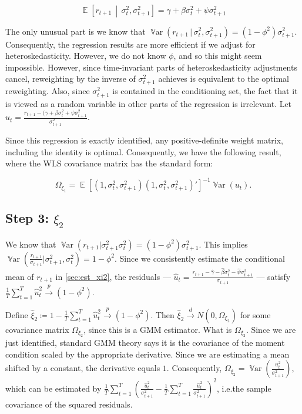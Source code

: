 \documentclass[11pt, letterpaper, twoside, final]{article}
\newcommand*{\dto}{\overset{d}{\longrightarrow}}
\newcommand*{\pto}{\overset{p}{\longrightarrow}}
\newcommand*{\mvert}{\,\middle\vert\,}
\newcommand*{\ivert}{\,\vert\,}
\DeclareMathOperator*{\Var}{\mathbb{V}ar}
\DeclareMathOperator*{\E}{\mathbb{E}}
\begin{document}
\begin{equation}
    \E\left[r_{t+1} \mvert \sigma^2_t, \sigma^2_{t+1}\right]  = \gamma + \beta \sigma^2_t + \psi \sigma^2_{t+1}
\end{equation}

The only unusual part is we know that $\Var(r_{t+1} \ivert \sigma^2_t, \sigma^2_{t+1}) = (1-\phi^2)
\sigma^2_{t+1}$.
Consequently, the regression results  are more efficient if we adjust for heteroskedasticity.
However, we do not know $\phi$, and so this might seem impossible.
However, since time-invariant parts of heteroskedasticity adjustments cancel, reweighting by the inverse of
$\sigma^2_{t+1}$ achieves is equivalent to the optimal reweighting. 
Also, since $\sigma^2_{t+1}$ is contained in the conditioning set, the fact that it is viewed as a random variable
in other parts  of the regression is irrelevant.
Let $u_t = \frac{r_{t+1} - (\gamma + \beta \sigma^2_{t} + \psi \sigma^2_{t+1}}{\sigma^2_{t+1}}$.

Since this regression is exactly identified, any positive-definite weight matrix, including the identity is
optimal.
Consequently, we have the following result, where the WLS covariance matrix has the standard form:

\begin{equation}
    \Omega_{\xi_1} = \E\left[\left(1, \sigma^2_{t}, \sigma^2_{t+1}\right) \left(1, \sigma^2_{t},
    \sigma^2_{t+1}\right)'\right]^{-1} \Var\left(u_t\right).
\end{equation}


\subsection{Step 3: $\xi_2$}

We know that $\Var(r_{t+1} \vert \sigma^2_{t+1} \sigma^2_t) = (1-\phi^2) \sigma^2_{t+1}$.
This implies $\Var(\frac{r_{t+1}}{\sigma_{t+1}} \vert \sigma^2_{t+1}, \sigma^2_t) = 1 - \phi^2$.
Since we consistently estimate the conditional mean of $r_{t+1}$ in \cref{sec:est_xi2}, the residuals ---
$\widehat{u}_t = \frac{r_{t+1} - \widehat{\gamma} - \widehat{\beta}\sigma^2_t - \widehat{\psi}
\sigma^2_{t+1}}{\sigma_{t+1}}$ --- satisfy $\frac{1}{T} \sum_{t=1}^T \hat{u}_t^2 \pto (1 - \phi^2)$.

Define $\widehat{\xi}_2 \coloneqq 1 - \frac{1}{T} \sum_{t=1}^T \hat{u}_t^2 \pto (1 - \phi^2)$.
Then $\widehat{\xi}_2 \dto N(0, \Omega_{\xi_2})$ for some covariance matrix $\Omega_{\xi_2}$, since this is a  GMM
estimator.
What is $\Omega_{\xi_2}$.
Since we are just identified, standard GMM theory says it is the covariance of the moment condition scaled by the
appropriate derivative. 
Since we are estimating a mean shifted by a constant, the derivative equals $1$.
Consequently, $\Omega_{\xi_2} = \Var(\frac{u^2_t}{\sigma^2_{t+1}})$, which can be estimated by
$\frac{1}{T} \sum_{t=1}^T (\frac{\widehat{u}_t^2}{\sigma^2_{t+1}} - \frac{1}{T} \sum_{t=1}^T
\frac{\widehat{u}_t^2}{\sigma^2_{t+1}})^2$, i.e.\@ the sample covariance of the squared residuals. 
\end{document}
